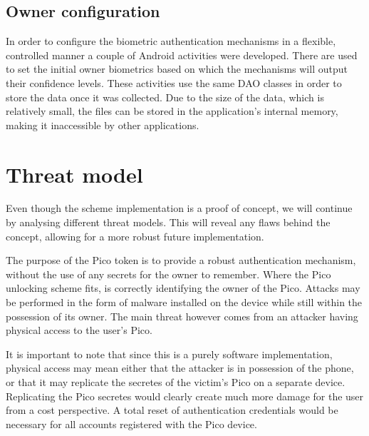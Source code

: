 \subsection{Owner configuration}
In order to configure the biometric authentication mechanisms in a flexible, controlled manner a couple of Android activities were developed. There are used to set the initial owner biometrics based on which the mechanisms will output their confidence levels. These activities use the same DAO classes in order to store the data once it was collected. Due to the size of the data, which is relatively small, the files can be stored in the application's internal memory, making it inaccessible by other applications.

\section{Threat model}

Even though the scheme implementation is a proof of concept, we will continue by analysing different threat models. This will reveal any flaws behind the concept, allowing for a more robust future implementation.

The purpose of the Pico token is to provide a robust authentication mechanism, without the use of any secrets for the owner to remember. Where the Pico unlocking scheme fits, is correctly identifying the owner of the Pico. Attacks may be performed in the form of malware installed on the device while still within the possession of its owner. The main threat however comes from an attacker having physical access to the user's Pico. 

It is important to note that since this is a purely software implementation, physical access may mean either that the attacker is in possession of the phone, or that it may replicate the secretes of the victim's Pico on a separate device. Replicating the Pico secretes would clearly create much more damage for the user from a cost perspective. A total reset of authentication credentials would be necessary for all accounts registered with the Pico device.


